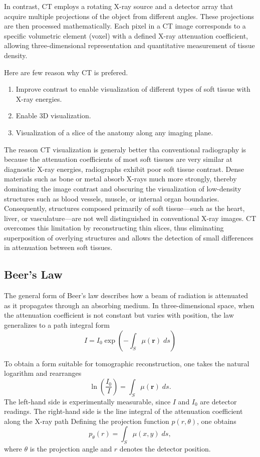 \documentclass[../../../main.tex]{subfiles}
\begin{document}
In contrast, CT employs a rotating X-ray source and a detector array that acquire multiple projections of the object from different angles.
These projections are then processed mathematically.
Each pixel in a CT image corresponds to a specific volumetric element (voxel) with a defined X-ray attenuation coefficient, allowing three-dimensional representation and quantitative measurement of tissue density.

Here are few reason why CT is prefered.
\begin{enumerate}
    \item Improve contrast to enable visualization of different types of soft tissue with X-ray energies.
    \item Enable 3D visualization.
    \item Visualization of a slice of the anatomy along any imaging plane.
\end{enumerate}

The reason CT visualization is generaly better tha conventional radiography is because the attenuation coefficients of most soft tissues are very similar at diagnostic X-ray energies, radiographs exhibit poor soft tissue contrast.
Dense materials such as bone or metal absorb X-rays much more strongly, thereby dominating the image contrast and obscuring the visualization of low-density structures such as blood vessels, muscle, or internal organ boundaries.
Consequently, structures composed primarily of soft tissue—such as the heart, liver, or vasculature—are not well distinguished in conventional X-ray images.
CT overcomes this limitation by reconstructing thin slices, thus eliminating superposition of overlying structures and allows the detection of small differences in attenuation between soft tissues.

\subsection{Beer's Law}
The general form of Beer’s law describes how a beam of radiation is attenuated as it propagates through an absorbing medium.
In three-dimensional space, when the attenuation coefficient is not constant but varies with position, the law generalizes to a path integral form
\begin{equation*}
    I=I_0\exp \left( -\int_S \mu(\mathbf{r })\;ds \right)
\end{equation*}

To obtain a form suitable for tomographic reconstruction, one takes the natural logarithm and rearranges
\begin{equation*}
    \ln\!\left(\frac{I_0}{I}\right) = \int_{S} \mu(\mathbf{r}) \; ds.
\end{equation*}
The left-hand side is experimentally measurable, since $I$ and $I_0$ are detector readings.
The right-hand side is the line integral of the attenuation coefficient along the X-ray path
Defining the projection function $p(r,\theta)$, one obtains
\begin{equation*}
    p_\theta(r)    = \int_{S} \mu(x,y) \; ds,
\end{equation*}
where $\theta$ is the projection angle and $r$ denotes the detector position.
\end{document}
